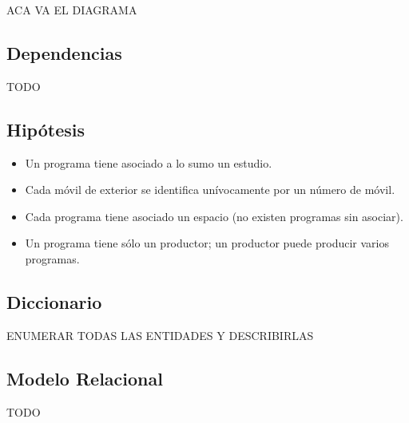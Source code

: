 \documentclass[a4paper,10pt,titlepage]{article}
\begin{document}
ACA VA EL DIAGRAMA

\pagebreak

\subsection{Dependencias}
TODO

\pagebreak

\subsection{Hip\'otesis}
\begin{itemize}
\item Un programa tiene asociado a lo sumo un estudio.
\item Cada m\'ovil de exterior se identifica un\'ivocamente por un n\'umero de m\'ovil.
\item Cada programa tiene asociado un espacio (no existen programas sin asociar).
\item Un programa tiene s\'olo un productor; un productor puede producir varios programas.
\end{itemize}
\pagebreak

\subsection{Diccionario}
ENUMERAR TODAS LAS ENTIDADES Y DESCRIBIRLAS

\pagebreak
\subsection{Modelo Relacional}
TODO
\pagebreak
\end{document}
